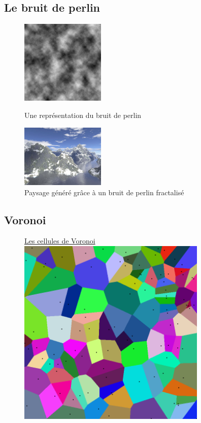 \documentclass{beamer}
\begin{document}
\subsection{Le bruit de perlin}
\begin{frame}
	\begin{center}
	 \begin{figure}
	  \includegraphics[width=4cm]{Images/Images_Alexis/perlin_noise.png}
	  \caption{Une représentation du bruit de perlin}
	  \includegraphics[width=4cm]{Images/Images_Alexis/fractal&shader.jpg}
	  \caption{Paysage généré grâce à un bruit de perlin fractalisé}
	 \end{figure}
	\end{center}
\end{frame}

\subsection{Voronoi}
\begin{frame}
 \begin{center}
  \begin{figure}
	 \LARGE \ul{Les cellules de Voronoi}
   \includegraphics[width=9cm]{Images/Images_Alexis/voronoi.png}
  \end{figure}

 \end{center}

\end{frame}
\end{document}
